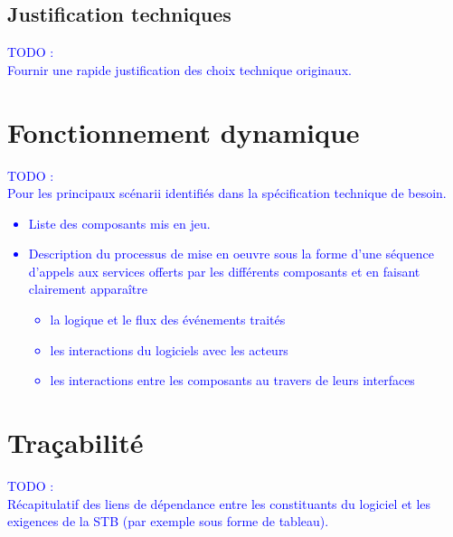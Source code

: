 \documentclass{../res/univ-projet}
\begin{document}
  \subsection{Justification techniques} %
    \textcolor{blue}{
      TODO : \\
      Fournir une rapide justification des choix technique originaux.
    }
\section{Fonctionnement dynamique} %
\label{sec:fonctionnement_dynamique}

  \textcolor{blue}{
    TODO : \\
    Pour les principaux scénarii identifiés dans la spécification technique de besoin.
    \begin{itemize}
      \item Liste des composants mis en jeu.
      \item Description du processus de mise en oeuvre sous la forme d'une
      séquence d'appels aux services offerts par les différents composants et en faisant
      clairement apparaître
      \begin{itemize}
        \item la logique et le flux des événements traités
        \item les interactions du logiciels avec les acteurs
        \item les interactions entre les composants au travers de leurs interfaces
      \end{itemize}
    \end{itemize}
  }

\section{Traçabilité} %
\label{sec:tra_abilit_}

  \textcolor{blue}{
    TODO : \\
    Récapitulatif des liens de dépendance entre les constituants du logiciel et les exigences de
    la STB (par exemple sous forme de tableau).
  }

\end{document}
